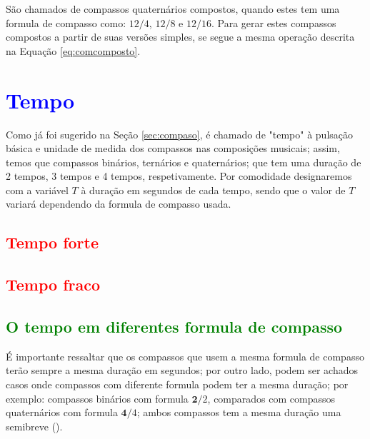São chamados de compassos quaternários compostos,  
quando estes tem uma formula de compasso como: $12/4$, $12/8$ e $12/16$.
Para gerar estes compassos compostos a partir de suas versões simples,
se segue a mesma operação descrita na Equação \ref{eq:comcomposto}.
 


\section{\textcolor{blue}{Tempo}}

Como já foi sugerido na Seção \ref{sec:compaso}, é chamado de "tempo" 
à pulsação básica e unidade de medida dos compassos nas composições musicais;
assim, temos que compassos binários, ternários e quaternários; que tem uma duração de 2 tempos, 
3 tempos e 4 tempos, respetivamente. Por comodidade designaremos com a variável $T$ à duração em segundos de cada tempo,
sendo que o valor de $T$ variará dependendo da formula de compasso usada.

\subsection{\textcolor{red}{Tempo forte}}


\subsection{\textcolor{red}{Tempo fraco}}

\subsection{\textcolor{green}{O tempo em diferentes formula de compasso}}
É importante ressaltar que os compassos que usem a mesma formula de compasso terão sempre a mesma duração em segundos;
por outro lado, podem ser achados casos onde compassos com diferente formula podem ter a mesma duração;
por exemplo: compassos binários com formula $\mathbf{2}/2$, comparados com compassos quaternários com 
formula $\mathbf{4}/4$; ambos compassos tem a mesma duração uma semibreve (\fullnote).

